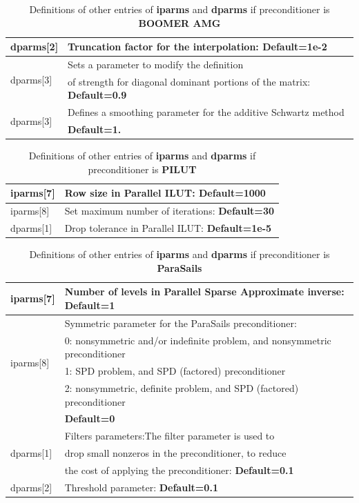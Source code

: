 \documentclass[a4paper,twoside,12pt]{book}
\begin{document}
\begin{table}[hbtp]
\begin{tabular}{|l|l|}
dparms[2]& Truncation factor for the interpolation: \textbf{ Default=1e-2} \\
\hline
\multirow{2}{*}{dparms[3]}& Sets a parameter to modify the definition \\
& of strength for diagonal dominant portions of the matrix: \textbf{
Default=0.9} \\ \hline
\multirow{2}{*}{dparms[3]} & Defines a smoothing parameter for the additive
Schwartz method \\
& \textbf{ Default=1.} \\ \hline
 \end{tabular}
\caption{Definitions of other entries of \textbf{iparms} and \textbf{dparms} if
preconditioner is \textbf{BOOMER AMG}}
\label{AMGHypre}
\end{table}

\begin{table}[hbtp]
\begin{center}
 \begin{tabular}{|l|l|} \hline
iparms[7]& Row size in Parallel ILUT: \textbf{ Default=1000} \\ \hline
iparms[8]& Set maximum number of iterations: \textbf{ Default=30} \\ \hline
dparms[1]& Drop tolerance in Parallel ILUT: \textbf{ Default=1e-5} \\ \hline
 \end{tabular}
\end{center}
\caption{Definitions of other entries of \textbf{iparms} and \textbf{dparms} if
preconditioner is \textbf{PILUT}}
\label{AMGHypre}
\end{table}

\begin{table}[hbtp]
 \begin{tabular}{|l|l|} \hline
iparms[7]& Number of levels in Parallel Sparse Approximate inverse: \textbf{
Default=1} \\ \hline
\multirow{4}{*}{iparms[8]}& Symmetric parameter for the ParaSails
preconditioner:\\
& 0: nonsymmetric and/or indefinite problem, and nonsymmetric preconditioner\\
& 1: SPD problem, and SPD (factored) preconditioner\\
& 2: nonsymmetric, definite problem, and SPD (factored) preconditioner\\
&   \textbf{ Default=0} \\ \hline
\multirow{3}{*}{dparms[1]} & Filters parameters:The filter parameter is used to
\\
& drop small nonzeros in the preconditioner, to reduce \\
& the cost of applying the preconditioner: \textbf{ Default=0.1}  \\ \hline
dparms[2] & Threshold parameter: \textbf{ Default=0.1} \\ \hline
 \end{tabular}
\caption{Definitions of other entries of \textbf{iparms} and \textbf{dparms} if
preconditioner is \textbf{ParaSails}}
\label{AMGHypre}
\end{table}
\end{document}

